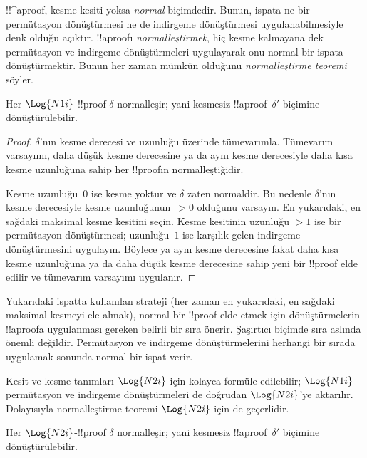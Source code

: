 \documentclass[../../../include/open-logic-section]{subfiles}
\begin{document}


!!^a{proof}, kesme kesiti yoksa \emph{normal} biçimdedir. Bunun, ispata ne
bir permütasyon dönüştürmesi ne de indirgeme dönüştürmesi uygulanabilmesiyle
denk olduğu açıktır. !!a{proof}{}ı \emph{normalleştirmek}, hiç kesme kalmayana
dek permütasyon ve indirgeme dönüştürmeleri uygulayarak onu normal bir ispata
dönüştürmektir. Bunun her zaman mümkün olduğunu \emph{normalleştirme teoremi}
söyler.

\begin{thm} Her $\Log{N1i}$-!!{proof}
$\delta$ normalleşir; yani kesmesiz !!a{proof}~$\delta'$ biçimine
dönüştürülebilir.
\end{thm}

\begin{proof}
  $\delta$'nın kesme derecesi ve uzunluğu üzerinde tümevarımla. Tümevarım
  varsayımı, daha düşük kesme derecesine ya da aynı kesme derecesiyle daha
kısa kesme uzunluğuna sahip her !!{proof}{}ın normalleştiğidir.

  Kesme uzunluğu~$0$ ise kesme yoktur ve $\delta$ zaten normaldir. Bu nedenle
  $\delta$'nın kesme derecesiyle kesme uzunluğunun~$>0$ olduğunu varsayın. En
  yukarıdaki, en sağdaki maksimal kesme kesitini seçin. Kesme kesitinin
  uzunluğu $>1$ ise bir permütasyon dönüştürmesi; uzunluğu~$1$ ise karşılık
  gelen indirgeme dönüştürmesini uygulayın. Böylece ya aynı kesme derecesine
  fakat daha kısa kesme uzunluğuna ya da daha düşük kesme derecesine sahip
  yeni bir !!{proof} elde edilir ve tümevarım varsayımı uygulanır.
\end{proof}

Yukarıdaki ispatta kullanılan strateji (her zaman en yukarıdaki, en sağdaki
maksimal kesmeyi ele almak), normal bir !!{proof} elde etmek için
dönüştürmelerin !!a{proof}{}a uygulanması gereken belirli bir sıra önerir.
Şaşırtıcı biçimde sıra aslında önemli değildir. Permütasyon ve indirgeme
dönüştürmelerini herhangi bir sırada uygulamak sonunda normal bir ispat verir.

Kesit ve kesme tanımları $\Log{N2i}$ için kolayca formüle edilebilir;
$\Log{N1i}$ permütasyon ve indirgeme dönüştürmeleri de doğrudan $\Log{N2i}$'ye
aktarılır. Dolayısıyla normalleştirme teoremi $\Log{N2i}$ için de geçerlidir.

\begin{thm} Her $\Log{N2i}$-!!{proof}
$\delta$ normalleşir; yani kesmesiz !!a{proof}~$\delta'$ biçimine
dönüştürülebilir.
\end{thm}
\end{document}
